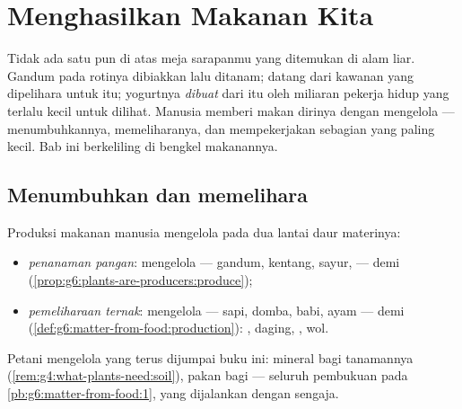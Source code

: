 \chapter{Menghasilkan Makanan Kita}\label{ch:g6:producing-our-food}

Tidak ada satu pun di atas meja sarapanmu yang ditemukan di alam
liar. Gandum pada rotinya dibiakkan lalu ditanam;  datang dari
kawanan yang dipelihara untuk itu; yogurtnya \emph{dibuat} dari 
itu oleh miliaran pekerja hidup yang terlalu kecil untuk dilihat.
Manusia memberi makan dirinya dengan mengelola  ---
menumbuhkannya, memeliharanya, dan mempekerjakan sebagian yang paling
kecil. Bab ini berkeliling di bengkel makanannya.

\section{Menumbuhkan dan memelihara}

\begin{definition}\label{def:g6:producing-our-food:farming}
Produksi makanan manusia mengelola  pada dua lantai daur
materinya:
\begin{itemize}
  \item \emph{penanaman pangan}: mengelola
         --- gandum, kentang, sayur,  --- demi 
        (\cref{prop:g6:plants-are-producers:produce});
  \item \emph{pemeliharaan ternak}: mengelola 
        --- sapi, domba, babi, ayam --- demi 
        (\cref{def:g6:matter-from-food:production}): , daging,
        , wol.
\end{itemize}
Petani mengelola  yang terus dijumpai buku ini: mineral 
bagi tanamannya (\cref{rem:g4:what-plants-need:soil}), pakan bagi
 --- seluruh pembukuan pada
\cref{pb:g6:matter-from-food:1}, yang dijalankan dengan sengaja.
\end{definition}

